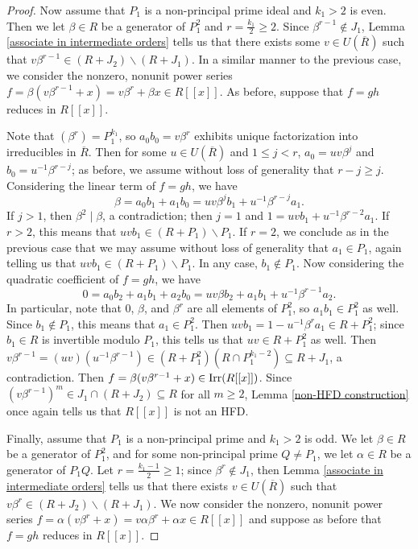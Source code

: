 \documentclass[12pt]{amsart}
\theoremstyle{definition}
\newcommand{\Rbar}{{\overline{R}}}
\newcommand{\Irr}{\textup{Irr}}
\begin{document}
\begin{proof}
    Now assume that $P_1$ is a non-principal prime ideal and $k_1>2$ is even. Then we let $\beta\in R$ be a generator of $P_1^2$ and $r=\frac{k_1}{2}\geq 2$. Since $\beta^{r-1}\notin J_1$, Lemma \ref{associate in intermediate orders} tells us that there exists some $v\in U(\Rbar)$ such that $v\beta^{r-1}\in (R+J_2)\backslash(R+J_1)$. In a similar manner to the previous case, we consider the nonzero, nonunit power series $f=\beta(v\beta^{r-1}+x)=v\beta^{r}+\beta x\in R[[x]].$
    As before, suppose that $f=gh$ reduces in $R[[x]]$.
    
    Note that $(\beta^{r})=P_1^{k_1}$, so $a_0b_0=v\beta^{r}$ exhibits unique factorization into irreducibles in $\Rbar$. Then for some $u\in U(\Rbar)$ and $1\leq j< r$, $a_0=uv\beta^j$ and $b_0=u^{-1}\beta^{r-j}$; as before, we assume without loss of generality that $r-j\geq j$. Considering the linear term of $f=gh$, we have
    $$\beta=a_0b_1+a_1b_0=uv\beta^jb_1+u^{-1}\beta^{r-j}a_1.$$
    If $j>1$, then $\beta^2\mid \beta$, a contradiction; then $j=1$ and $1=uvb_1+u^{-1}\beta^{r-2}a_1$. If $r>2$, this means that $uvb_1\in (R+P_1)\backslash P_1$. If $r=2$, we conclude as in the previous case that we may assume without loss of generality that $a_1\in P_1$, again telling us that $uvb_1\in (R+P_1)\backslash P_1.$ In any case, $b_1\notin P_1$. Now considering the quadratic coefficient of $f=gh$, we have
    $$0=a_0b_2+a_1b_1+a_2b_0=uv\beta b_2+a_1b_1+u^{-1}\beta^{r-1}a_2.$$
    In particular, note that $0$, $\beta$, and $\beta^{r}$ are all elements of $P_1^2$, so $a_1b_1\in P_1^2$ as well. Since $b_1\notin P_1$, this means that $a_1\in P_1^2$. Then $uvb_1=1-u^{-1}\beta^{r}a_1\in R+P_1^2$; since $b_1\in R$ is invertible modulo $P_1$, this tells us that $uv\in R+P_1^2$ as well. Then $v\beta^{r-1}=(uv)(u^{-1}\beta^{r-1})\in (R+P_1^2)(R\cap P_1^{k_1-2})\subseteq R+J_1$, a contradiction. Then $f=\beta(v\beta^{r-1}+x)\in \Irr(R[[x]])$. Since $(v\beta^{r-1})^m\in J_1\cap (R+J_2)\subseteq R$ for all $m\geq 2$, Lemma \ref{non-HFD construction} once again tells us that $R[[x]]$ is not an HFD.

    Finally, assume that $P_1$ is a non-principal prime and $k_1> 2$ is odd. We let $\beta\in R$ be a generator of $P_1^2$, and for some non-principal prime $Q\neq P_1$, we let $\alpha\in R$ be a generator of $P_1Q$. Let $r=\frac{k_1-1}{2}\geq 1$; since $\beta^r\notin J_1$, then Lemma \ref{associate in intermediate orders} tells us that there exists $v\in U(\Rbar)$ such that $v\beta^r\in(R+J_2)\backslash (R+J_1)$. We now consider the nonzero, nonunit power series $f=\alpha(v\beta^r+x)=v\alpha\beta^r+\alpha x\in R[[x]]$
    and suppose as before that $f=gh$ reduces in $R[[x]]$.
    

\end{proof}
\end{document}
